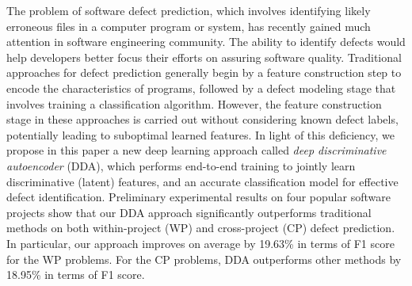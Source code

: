 The problem of software defect prediction, which involves identifying likely erroneous files in a computer program or system, has recently gained much attention in software engineering community. The ability to identify defects would help developers better focus their efforts on assuring software quality. Traditional approaches for defect prediction generally begin by a feature construction step to encode the characteristics of programs, followed by a defect modeling stage that involves training a classification algorithm. However, the feature construction stage in these approaches is carried out without considering known defect labels, potentially leading to suboptimal learned features. In light of this deficiency, we propose in this paper a new deep learning approach called \emph{deep discriminative autoencoder} (DDA), which performs end-to-end training to jointly learn discriminative (latent) features, and an accurate classification model for effective defect identification. Preliminary experimental results on four popular software projects show that our DDA approach significantly outperforms traditional methods on both within-project (WP) and cross-project (CP) defect prediction. In particular, our approach improves on average by 19.63\% in terms of F1 score for the WP problems. For the CP problems, DDA outperforms other methods by 18.95\% in terms of F1 score.




